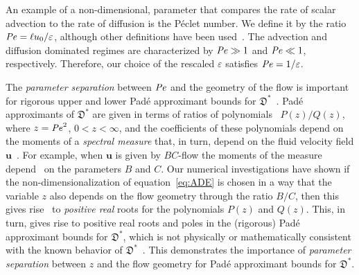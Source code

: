 \documentclass[english,12pt,jmp,graphicx]{revtex4-1}
\newcommand{\Pen}{\mbox{\textit{Pe}}}  %
\newcommand{\vecu}{\boldsymbol{u}}
\newcommand{\Dg}{\mathfrak{D}}
\begin{document}
An example of a non-dimensional, parameter that compares the rate of
scalar advection to the rate of diffusion is the P\'{e}clet number.
We define it by the ratio $\Pen=\ell u_0/\varepsilon$, although
other definitions have been
used~\cite{McLaughlin:Forest:PF:1999:880,Majda:Kramer:1999:book,Majda:Kramer:1999:book}.
The
advection and diffusion dominated regimes are characterized by
$\Pen\gg1$ and $\Pen\ll1$, respectively.  Therefore, our choice of the 
rescaled $\varepsilon$ satisfies $\Pen=1/\varepsilon$.



The \emph{parameter separation} between $\Pen$ and the
geometry of the flow is important for  rigorous upper and
lower Pad\'{e} approximant bounds for
$\Dg^*$~\cite{Avellaneda:CMP-339,Murphy_Pade_Bounds}. Pad\'{e} 
approximants of $\Dg^*$ are given in terms of ratios of
polynomials~\cite{Baker:1996:Book:Pade} $P(z)/Q(z)$, where $z=\Pen^2$,
$0<z<\infty$, and the coefficients of these polynomials depend
on the moments of a \emph{spectral measure} that, in turn, depend on
the fluid velocity field
$\vecu$~\cite{Avellaneda:CMP-339,Murphy_Pade_Bounds}. For example,
when $\vecu$ is given by $BC$-flow the moments of the measure
depend~\cite{Murphy_Pade_Bounds} on the parameters $B$ and $C$. Our
numerical investigations have shown if the non-dimensionalization of
equation~\eqref{eq:ADE} is chosen in a way that the variable $z$ also
depends on the flow geometry through the ratio $B/C$, then this gives 
rise~\cite{Murphy_Pade_Bounds} to \emph{positive real} roots for the
polynomials $P(z)$ and $Q(z)$. This, in turn, gives rise to positive
real roots and
poles in the (rigorous) Pad\'{e} approximant bounds for
$\Dg^*$, which is not physically or mathematically consistent with the
known behavior of
$\Dg^*$~\cite{Fannjiang:1994:SIAM_JAM:333,Pavliotis:PHD_Thesis,Biferale:PF:2725,Majda:Kramer:1999:book}. 
This demonstrates the importance of \emph{parameter separation}
between $z$ and the flow geometry for Pad\'{e} 
approximant bounds for $\Dg^*$.
\end{document}
